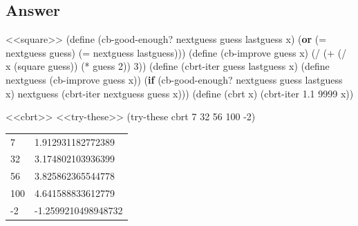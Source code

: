 \documentclass[
]{article}
\newenvironment{Shaded}{}{}
\newcommand{\DecValTok}[1]{\textcolor[rgb]{0.25,0.63,0.44}{#1}}
\newcommand{\ExtensionTok}[1]{#1}
\newcommand{\FloatTok}[1]{\textcolor[rgb]{0.25,0.63,0.44}{#1}}
\newcommand{\FunctionTok}[1]{\textcolor[rgb]{0.02,0.16,0.49}{#1}}
\newcommand{\KeywordTok}[1]{\textcolor[rgb]{0.00,0.44,0.13}{\textbf{#1}}}
\newcommand{\NormalTok}[1]{#1}
\newcommand{\OperatorTok}[1]{\textcolor[rgb]{0.40,0.40,0.40}{#1}}
\begin{document}
\hypertarget{answer-7}{%
\subsection{Answer}\label{answer-7}}

\hypertarget{cbrt}{%
\label{cbrt}}%
\begin{Shaded}
\begin{Highlighting}[numbers=left,,]
\NormalTok{\textless{}\textless{}square\textgreater{}\textgreater{}}
\NormalTok{(}\ExtensionTok{define}\FunctionTok{ }\NormalTok{(cb{-}good{-}enough? nextguess guess lastguess x)}
\NormalTok{  (}\KeywordTok{or}\NormalTok{ (}\OperatorTok{=}\NormalTok{ nextguess guess)}
\NormalTok{      (}\OperatorTok{=}\NormalTok{ nextguess lastguess)))}
\NormalTok{(}\ExtensionTok{define}\FunctionTok{ }\NormalTok{(cb{-}improve guess x)}
\NormalTok{  (}\OperatorTok{/}
\NormalTok{   (}\OperatorTok{+}
\NormalTok{    (}\OperatorTok{/}\NormalTok{ x (square guess))}
\NormalTok{    (}\OperatorTok{*}\NormalTok{ guess }\DecValTok{2}\NormalTok{))}
   \DecValTok{3}\NormalTok{))}
\NormalTok{(}\ExtensionTok{define}\FunctionTok{ }\NormalTok{(cbrt{-}iter guess lastguess x)}
\NormalTok{  (}\ExtensionTok{define}\FunctionTok{ nextguess }\NormalTok{(cb{-}improve guess x))}
\NormalTok{  (}\KeywordTok{if}\NormalTok{ (cb{-}good{-}enough? nextguess guess lastguess x)}
\NormalTok{      nextguess}
\NormalTok{      (cbrt{-}iter nextguess guess x)))}
\NormalTok{(}\ExtensionTok{define}\FunctionTok{ }\NormalTok{(cbrt x)}
\NormalTok{  (cbrt{-}iter }\FloatTok{1.1} \DecValTok{9999}\NormalTok{ x))}
\end{Highlighting}
\end{Shaded}

\begin{Shaded}
\begin{Highlighting}[numbers=left,,]
\NormalTok{\textless{}\textless{}cbrt\textgreater{}\textgreater{}}
\NormalTok{\textless{}\textless{}try{-}these\textgreater{}\textgreater{}}
\NormalTok{(try{-}these cbrt }\DecValTok{7} \DecValTok{32} \DecValTok{56} \DecValTok{100}\NormalTok{ {-}}\DecValTok{2}\NormalTok{)}
\end{Highlighting}
\end{Shaded}

\begin{longtable}[]{@{}ll@{}}
\toprule
\endhead
7 & 1.912931182772389 \\
32 & 3.174802103936399 \\
56 & 3.825862365544778 \\
100 & 4.641588833612779 \\
-2 & -1.2599210498948732 \\
\bottomrule
\end{longtable}
\end{document}
